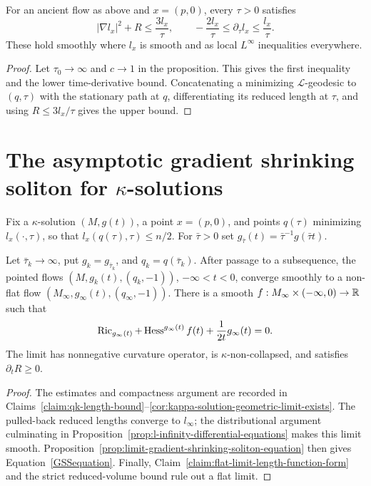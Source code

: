 \begin{corollary}\label{cor:l-function-gradient-bound}
\label{unianc}

For an ancient flow as above and $x=(p,0)$, every $\tau>0$ satisfies
\[
 |\nabla l_x|^2+R\leq\frac{3l_x}{\tau},
 \qquad
 -\frac{2l_x}{\tau}\leq\partial_\tau l_x
 \leq\frac{l_x}{\tau}.
\]
These hold smoothly where $l_x$ is smooth and as local
$L^\infty$ inequalities everywhere.
\end{corollary}
\begin{proof}
\sketch
{}
Let $\tau_0\to\infty$ and $c\to1$ in the proposition. This gives the
first inequality and the lower time-derivative bound. Concatenating
a minimizing $\mathcal L$-geodesic to $(q,\tau)$ with the stationary
path at $q$, differentiating its reduced length at $\tau$, and using
$R\leq3l_x/\tau$ gives the upper bound.
\end{proof}

\section{The asymptotic gradient shrinking soliton for
$\kappa$-solutions}\label{sect9.2}

Fix a $\kappa$-solution $(M,g(t))$, a point $x=(p,0)$, and points
$q(\tau)$ minimizing $l_x(\cdot,\tau)$, so that
$l_x(q(\tau),\tau)\leq n/2$. For $\bar\tau>0$ set
$g_{\bar\tau}(t)=\bar\tau^{-1}g(\bar\tau t)$.

\begin{theorem}\label{thm:asymptotic-gradient-shrinking-soliton}
\label{asympGSS}

Let $\bar\tau_k\to\infty$, put $g_k=g_{\bar\tau_k}$, and
$q_k=q(\bar\tau_k)$. After passage to a subsequence, the pointed
flows $(M,g_k(t),(q_k,-1))$, $-\infty<t<0$, converge smoothly to a
non-flat flow $(M_\infty,g_\infty(t),(q_\infty,-1))$. There is a
smooth $f:M_\infty\times(-\infty,0)\to\mathbb{R}$ such that
\begin{equation}\label{GSSequation}
 \operatorname{Ric}_{g_\infty(t)}+\operatorname{Hess}^{g_\infty(t)}f(t)
 +\frac1{2t}g_\infty(t)=0.
\end{equation}
The limit has nonnegative curvature operator, is
$\kappa$-non-collapsed, and satisfies $\partial_tR\geq0$.
\end{theorem}
\begin{proof}
\sketch The estimates and compactness argument are recorded in
Claims~\ref{claim:qk-length-bound}--\ref{cor:kappa-solution-geometric-limit-exists}.
The pulled-back reduced lengths converge to $l_\infty$; the
distributional argument culminating in
Proposition~\ref{prop:l-infinity-differential-equations} makes this
limit smooth. Proposition~\ref{prop:limit-gradient-shrinking-soliton-equation}
then gives Equation~\ref{GSSequation}. Finally,
Claim~\ref{claim:flat-limit-length-function-form} and the strict
reduced-volume bound rule out a flat limit.
\end{proof}

